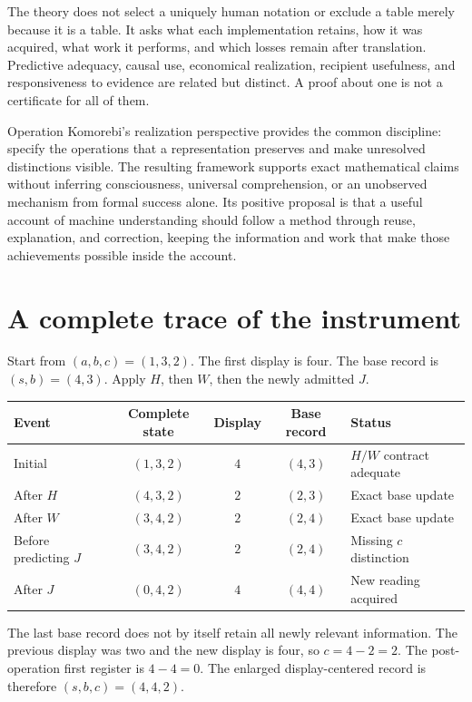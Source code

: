 \documentclass[11pt,letterpaper]{article}
\theoremstyle{plain}
\theoremstyle{definition}
\begin{document}
The theory does not select a uniquely human notation or exclude a table merely because it is a table. It asks what each implementation retains, how it was acquired, what work it performs, and which losses remain after translation. Predictive adequacy, causal use, economical realization, recipient usefulness, and responsiveness to evidence are related but distinct. A proof about one is not a certificate for all of them.

Operation Komorebi's realization perspective provides the common discipline: specify the operations that a representation preserves and make unresolved distinctions visible. The resulting framework supports exact mathematical claims without inferring consciousness, universal comprehension, or an unobserved mechanism from formal success alone. Its positive proposal is that a useful account of machine understanding should follow a method through reuse, explanation, and correction, keeping the information and work that make those achievements possible inside the account.

\clearpage\appendix
\section{A complete trace of the instrument}\label{app:trace}
Start from $(a,b,c)=(1,3,2)$. The first display is four. The base record is $(s,b)=(4,3)$. Apply $H$, then $W$, then the newly admitted $J$.

\begin{center}
\begin{tabular}{@{}lcccl@{}}\toprule
Event & Complete state & Display & Base record & Status\\\midrule
Initial & $(1,3,2)$ & $4$ & $(4,3)$ & $H/W$ contract adequate\\
After $H$ & $(4,3,2)$ & $2$ & $(2,3)$ & Exact base update\\
After $W$ & $(3,4,2)$ & $2$ & $(2,4)$ & Exact base update\\
Before predicting $J$ & $(3,4,2)$ & $2$ & $(2,4)$ & Missing $c$ distinction\\
After $J$ & $(0,4,2)$ & $4$ & $(4,4)$ & New reading acquired\\\bottomrule
\end{tabular}
\end{center}

The last base record does not by itself retain all newly relevant information. The previous display was two and the new display is four, so $c=4-2=2$. The post-operation first register is $4-4=0$. The enlarged display-centered record is therefore $(s,b,c)=(4,4,2)$.
\end{document}
